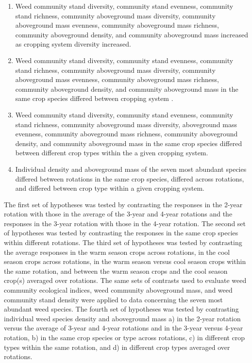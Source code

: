 \documentclass[
]{article}
\begin{document}
\begin{enumerate}
\def\labelenumi{\arabic{enumi})}
\item
  Weed community stand diversity, community stand evenness, community stand richness, community aboveground mass diversity, community aboveground mass evenness, community aboveground mass richness, community aboveground density, and community aboveground mass increased as cropping system diversity increased.
\item
  Weed community stand diversity, community stand evenness, community stand richness, community aboveground mass diversity, community aboveground mass evenness, community aboveground mass richness, community aboveground density, and community aboveground mass in the same crop species differed between cropping system .
\item
  Weed community stand diversity, community stand evenness, community stand richness, community aboveground mass diversity, aboveground mass evenness, community aboveground mass richness, community aboveground density, and community aboveground mass in the same crop species differed between different crop types within the a given cropping system.
\item
  Individual density and aboveground mass of the seven most abundant species differed between rotations in the same crop species, differed across rotations, and differed between crop type within a given cropping system.
\end{enumerate}

The first set of hypotheses was tested by contrasting the responses in the 2-year rotation with those in the average of the 3-year and 4-year rotations and the responses in the 3-year rotation with those in the 4-year rotation. The second set of hypotheses was tested by contrasting the responses in the same crop species within different rotations. The third set of hypotheses was tested by contrasting the average responses in the warm season crops across rotations, in the cool season crops across rotations, in the warm season versus cool season crops within the same rotation, and between the warm season crops and the cool season crop(s) averaged over rotations. The same sets of contrasts used to evaluate weed community ecological indices, weed community aboveground mass, and weed community stand density were applied to data concerning the seven most abundant weed species. The fourth set of hypotheses was tested by contrasting individual weed species density and aboveground mass a) in the 2-year rotation versus the average of 3-year and 4-year rotations and in the 3-year versus 4-year rotation, b) in the same crop species or type across rotations, c) in different crop types within the same rotation, and d) in different crop types averaged over rotations.
\end{document}
